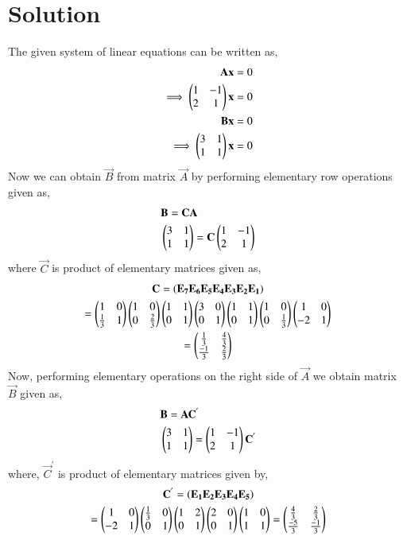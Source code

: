 \documentclass[journal,12pt,twocolumn]{IEEEtran}
\begin{document}
\section{Solution}
The given system of linear equations can be written as,   
\begin{align}
    \mathbf{A}\mathbf{x} &= 0 \\
    \implies\begin{pmatrix}1&-1\\2&1\end{pmatrix}\mathbf{x} &= 0 \label{ax=0}\\
    \mathbf{B}\mathbf{x} &= 0 \\
    \implies\begin{pmatrix}3&1\\1&1\end{pmatrix}\mathbf{x} &= 0 \label{bx=0}
\end{align}
Now we can obtain $\vec{B}$ from matrix $\vec{A}$ by performing elementary row operations given as, 
\begin{align}
    &\mathbf{B} = \mathbf{C}\mathbf{A} \\
    &\begin{pmatrix}3&1\\1&1\end{pmatrix} = \mathbf{C}\begin{pmatrix}1&-1\\2&1\end{pmatrix}
\end{align}
where $\vec{C}$ is product of elementary matrices given as, 
\begin{multline}
    \mathbf{C} = \left(\mathbf{E_7}\mathbf{E_6}\mathbf{E_5}\mathbf{E_4}\mathbf{E_3}\mathbf{E_2}\mathbf{E_1}\right)\\
    =\begin{pmatrix}1&0\\\frac{1}{3}&1\end{pmatrix}\begin{pmatrix}1&0\\0&\frac{2}{3}\end{pmatrix}\begin{pmatrix}1&1\\0&1\end{pmatrix}\begin{pmatrix}3&0\\0&1\end{pmatrix}\begin{pmatrix}1&1\\0&1\end{pmatrix}\begin{pmatrix}1&0\\0&\frac{1}{3}\end{pmatrix}\begin{pmatrix}1&0\\-2&1\end{pmatrix} \\
    =\begin{pmatrix}\frac{1}{3}&\frac{4}{3} \\ \frac{-1}{3}&\frac{2}{3}\end{pmatrix}
\end{multline}
Now, performing elementary operations on the right side of $\vec{A}$ we obtain matrix $\vec{B}$ given as, 
\begin{align}
    &\mathbf{B} = \mathbf{A}\mathbf{C}^{'} \\
    &\begin{pmatrix}3&1\\1&1\end{pmatrix} = \begin{pmatrix}1&-1\\2&1\end{pmatrix}\mathbf{C}^{'}
\end{align}
where, $\vec{C}^{'}$ is product of elementary matrices given by, 
\begin{multline}
    \mathbf{C}^{'} = \left(\mathbf{E_1}\mathbf{E_2}\mathbf{E_3}\mathbf{E_4}\mathbf{E_5}\right)\\
    =\begin{pmatrix}1&0\\-2&1\end{pmatrix}\begin{pmatrix}\frac{1}{3}&0\\0&1\end{pmatrix}\begin{pmatrix}1&2\\0&1\end{pmatrix}\begin{pmatrix}2&0\\0&1\end{pmatrix}\begin{pmatrix}1&0\\1&1\end{pmatrix}
    = \begin{pmatrix}\frac{4}{3}&\frac{2}{3}\\ \frac{-5}{3}&\frac{-1}{3}\end{pmatrix}
\end{multline}
\end{document}
